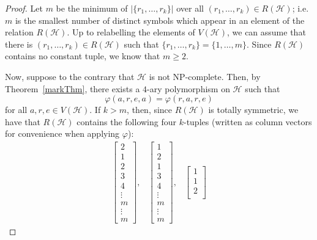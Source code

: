 \documentclass[11 pt]{amsart}
\theoremstyle{definition}
\theoremstyle{case}
\numberwithin{equation}{section}
\begin{document}
\begin{proof}
Let $m$ be the minimum of $|\{r_1,\dots, r_k\}|$ over all $(r_1,\dots,r_k)\in R(\mathcal{H})$; i.e. $m$ is the smallest number of distinct symbols which appear in an element of the relation $R(\mathcal{H})$. Up to relabelling the elements of $V(\mathcal{H})$, we can assume that there is $(r_1,\dots,r_k)\in R(\mathcal{H})$ such that $\{r_1,\dots,r_k\}=\{1,\dots,m\}$.  Since $R(\mathcal{H})$ contains no constant tuple, we know that $m\geq2$. 

Now, suppose to the contrary that $\mathcal{H}$ is not NP-complete. Then, by Theorem~\ref{markThm}, there exists a $4$-ary polymorphism on $\mathcal{H}$ such that
\begin{equation}\label{area}\varphi(a,r,e,a)=\varphi(r,a,r,e)\end{equation}
for all $a,r,e\in V(\mathcal{H})$. If $k>m$, then, since $R(\mathcal{H})$ is totally symmetric, we have that $R(\mathcal{H})$ contains the following four $k$-tuples (written as column vectors for convenience when applying $\varphi$):
\[\begin{array}{cccc}\begin{bmatrix}
           2 \\
           1 \\
           2 \\
           3 \\
           4\\
           \vdots \\
           m\\
           \vdots \\
           m
         \end{bmatrix}  ,       
&         
         \begin{bmatrix}
           1 \\
           2 \\
           1 \\
           3 \\
           4\\
           \vdots \\
           m\\
           \vdots \\
           m
         \end{bmatrix}  ,       
&         
         \begin{bmatrix}
           1 \\
           1 \\
           2 \\

\end{bmatrix}
\end{array}\]
\end{proof}
\end{document}
